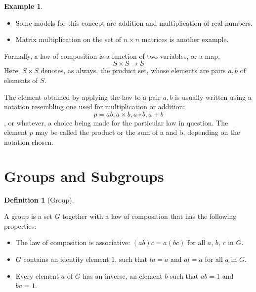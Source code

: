 \documentclass[
]{book}
\providecommand{\tightlist}{%
  \setlength{\itemsep}{0pt}\setlength{\parskip}{0pt}}
\theoremstyle{definition}
\newtheorem{definition}{Definition}[chapter]
\theoremstyle{definition}
\newtheorem{example}{Example}[chapter]
\theoremstyle{definition}
\theoremstyle{definition}
\theoremstyle{remark}
\begin{document}
\begin{example}
\protect\hypertarget{exm:unnamed-chunk-9}{}\label{exm:unnamed-chunk-9}\leavevmode

\begin{itemize}
\tightlist
\item
  Some models for this concept are addition and multiplication
  of real numbers.
\item
  Matrix multiplication on the set of \(n \times n\) matrices is another example.
\end{itemize}

\end{example}

Formally, a law of composition is a function of two variables, or a map,
\[S\times S \to S\]
Here, \(S \times S\) denotes, as always, the product set, whose elements are pairs \(a, b\) of elements of \(S\).

The element obtained by applying the law to a pair \(a, b\) is usually written using a notation resembling one used for multiplication or addition:
\[p = ab, a \times b, a \circ b, a + b\],
or whatever, a choice being made for the particular law in question. The element \(p\) may be called the product or the sum of a and b, depending on the notation chosen.

\hypertarget{groups-and-subgroups}{%
\section{Groups and Subgroups}\label{groups-and-subgroups}}

\begin{definition}[Group]
\protect\hypertarget{def:unnamed-chunk-10}{}\label{def:unnamed-chunk-10}

A group is a set \(G\) together with a law of composition that has the following properties:

\begin{itemize}
\tightlist
\item
  The law of composition is associative: \((ab)c = a(bc)\) for all \(a\), \(b\), \(c\) in \(G\).
\item
  \(G\) contains an identity element \(1\), such that \(la = a\) and \(al = a\) for all \(a\) in \(G\).
\item
  Every element \(a\) of \(G\) has an inverse, an element \(b\) such that \(ab = 1\) and \(ba = 1\).
\end{itemize}

\end{definition}
\end{document}
